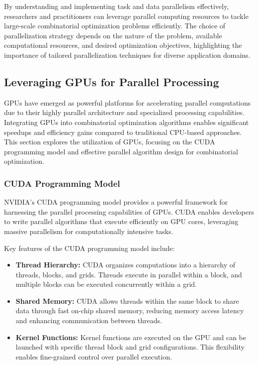 \documentclass[11pt]{report}
\begin{document}
        By understanding and implementing task and data parallelism effectively, researchers and practitioners can leverage parallel computing resources to tackle large-scale combinatorial optimization problems efficiently. The choice of parallelization strategy depends on the nature of the problem, available computational resources, and desired optimization objectives, highlighting the importance of tailored parallelization techniques for diverse application domains.

        \subsection{Leveraging GPUs for Parallel Processing}
        GPUs have emerged as powerful platforms for accelerating parallel computations due to their highly parallel architecture and specialized processing capabilities. Integrating GPUs into combinatorial optimization algorithms enables significant speedups and efficiency gains compared to traditional CPU-based approaches. This section explores the utilization of GPUs, focusing on the CUDA programming model and effective parallel algorithm design for combinatorial optimization.

        \subsubsection{CUDA Programming Model}
            NVIDIA's CUDA programming model provides a powerful framework for harnessing the parallel processing capabilities of GPUs. CUDA enables developers to write parallel algorithms that execute efficiently on GPU cores, leveraging massive parallelism for computationally intensive tasks.
            
            Key features of the CUDA programming model include:

            \begin{itemize}
                \item \textbf{Thread Hierarchy:} CUDA organizes computations into a hierarchy of threads, blocks, and grids. Threads execute in parallel within a block, and multiple blocks can be executed concurrently within a grid.
            
                \item \textbf{Shared Memory:} CUDA allows threads within the same block to share data through fast on-chip shared memory, reducing memory access latency and enhancing communication between threads.
            
                \item \textbf{Kernel Functions:} Kernel functions are executed on the GPU and can be launched with specific thread block and grid configurations. This flexibility enables fine-grained control over parallel execution.
            \end{itemize}
            
\end{document}

